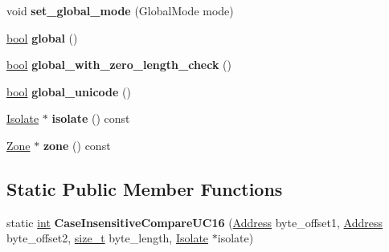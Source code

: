 \begin{DoxyCompactItemize}
void {\bfseries set\+\_\+global\+\_\+mode} (Global\+Mode mode)
\item 
\mbox{\label{classv8_1_1internal_1_1RegExpMacroAssembler_aa5d11940ad624a215a8706d01573ca22}} 
\mbox{\hyperlink{classbool}{bool}} {\bfseries global} ()
\item 
\mbox{\label{classv8_1_1internal_1_1RegExpMacroAssembler_ab5f358d7a47b7993cc9cf8160836acd5}} 
\mbox{\hyperlink{classbool}{bool}} {\bfseries global\+\_\+with\+\_\+zero\+\_\+length\+\_\+check} ()
\item 
\mbox{\label{classv8_1_1internal_1_1RegExpMacroAssembler_a49f5c3d17a70dfc99a0a46c2cfce0ef9}} 
\mbox{\hyperlink{classbool}{bool}} {\bfseries global\+\_\+unicode} ()
\item 
\mbox{\label{classv8_1_1internal_1_1RegExpMacroAssembler_a427e86ee343285b225666eca6a437681}} 
\mbox{\hyperlink{classv8_1_1internal_1_1Isolate}{Isolate}} $\ast$ {\bfseries isolate} () const
\item 
\mbox{\label{classv8_1_1internal_1_1RegExpMacroAssembler_a79c2138f3a331246b9ae564a75968179}} 
\mbox{\hyperlink{classv8_1_1internal_1_1Zone}{Zone}} $\ast$ {\bfseries zone} () const
\end{DoxyCompactItemize}
\subsection*{Static Public Member Functions}
\begin{DoxyCompactItemize}
\item 
\mbox{\label{classv8_1_1internal_1_1RegExpMacroAssembler_ae69f86f4af77ac94c6b6570704f37d89}} 
static \mbox{\hyperlink{classint}{int}} {\bfseries Case\+Insensitive\+Compare\+U\+C16} (\mbox{\hyperlink{classuintptr__t}{Address}} byte\+\_\+offset1, \mbox{\hyperlink{classuintptr__t}{Address}} byte\+\_\+offset2, \mbox{\hyperlink{classsize__t}{size\+\_\+t}} byte\+\_\+length, \mbox{\hyperlink{classv8_1_1internal_1_1Isolate}{Isolate}} $\ast$isolate)
\end{DoxyCompactItemize}
